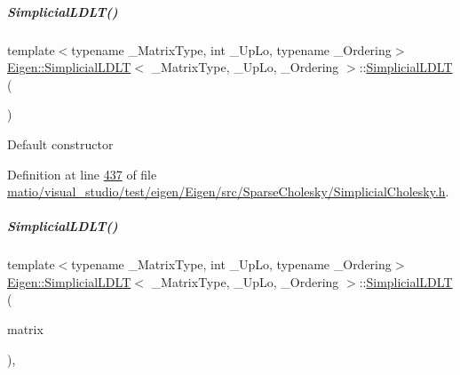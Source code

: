 \mbox{\label{group___sparse_cholesky___module_a3f26ae6105ffa36af9b8710e01e5caed}} 
\subparagraph{\texorpdfstring{Simplicial\+L\+D\+L\+T()}{SimplicialLDLT()}\hspace{0.1cm}{\footnotesize\ttfamily [3/4]}}
{\footnotesize\ttfamily template$<$typename \+\_\+\+Matrix\+Type, int \+\_\+\+Up\+Lo, typename \+\_\+\+Ordering$>$ \\
\hyperlink{group___sparse_cholesky___module_class_eigen_1_1_simplicial_l_d_l_t}{Eigen\+::\+Simplicial\+L\+D\+LT}$<$ \+\_\+\+Matrix\+Type, \+\_\+\+Up\+Lo, \+\_\+\+Ordering $>$\+::\hyperlink{group___sparse_cholesky___module_class_eigen_1_1_simplicial_l_d_l_t}{Simplicial\+L\+D\+LT} (\begin{DoxyParamCaption}{ }\end{DoxyParamCaption})\hspace{0.3cm}{\ttfamily [inline]}}

Default constructor 

Definition at line \hyperlink{matio_2visual__studio_2test_2eigen_2_eigen_2src_2_sparse_cholesky_2_simplicial_cholesky_8h_source_l00437}{437} of file \hyperlink{matio_2visual__studio_2test_2eigen_2_eigen_2src_2_sparse_cholesky_2_simplicial_cholesky_8h_source}{matio/visual\+\_\+studio/test/eigen/\+Eigen/src/\+Sparse\+Cholesky/\+Simplicial\+Cholesky.\+h}.

\mbox{\label{group___sparse_cholesky___module_a07cb76aee396862f94c3eedc6d77d908}} 
\subparagraph{\texorpdfstring{Simplicial\+L\+D\+L\+T()}{SimplicialLDLT()}\hspace{0.1cm}{\footnotesize\ttfamily [4/4]}}
{\footnotesize\ttfamily template$<$typename \+\_\+\+Matrix\+Type, int \+\_\+\+Up\+Lo, typename \+\_\+\+Ordering$>$ \\
\hyperlink{group___sparse_cholesky___module_class_eigen_1_1_simplicial_l_d_l_t}{Eigen\+::\+Simplicial\+L\+D\+LT}$<$ \+\_\+\+Matrix\+Type, \+\_\+\+Up\+Lo, \+\_\+\+Ordering $>$\+::\hyperlink{group___sparse_cholesky___module_class_eigen_1_1_simplicial_l_d_l_t}{Simplicial\+L\+D\+LT} (\begin{DoxyParamCaption}\item[{const Matrix\+Type \&}]{matrix }\end{DoxyParamCaption})\hspace{0.3cm}{\ttfamily [inline]}, {\ttfamily [explicit]}}

